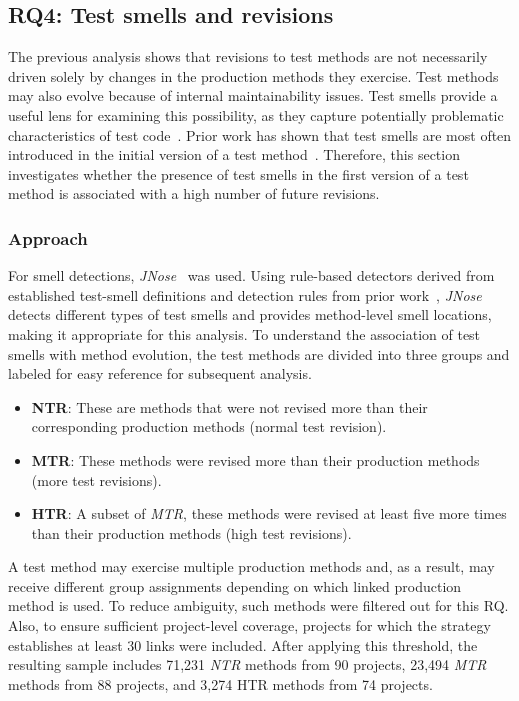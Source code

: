 \subsection{RQ4: Test smells and revisions}
The previous analysis shows that revisions to test methods are not necessarily driven solely by changes in the production methods they exercise. Test methods may also evolve because of internal maintainability issues. Test smells provide a useful lens for examining this possibility, as they capture potentially problematic characteristics of test code~\cite{bavota2015test,Spadini:2018,panichella2022test}. Prior work has shown that test smells are most often introduced in the initial version of a test method~\cite{tufano2016empirical}. Therefore, this section investigates whether the presence of test smells in the first version of a test method is associated with a high number of future revisions.

\subsubsection{Approach}
For smell detections, \emph{JNose}~\cite{virginio2020jnose} was used. Using rule-based detectors derived from established test-smell definitions and detection rules from prior work~\cite{tufano2016empirical,garousi2018smells}, \emph{JNose} detects different types of test smells and provides method-level smell locations, making it appropriate for this analysis. To understand the association of test smells with method evolution, the test methods are divided into three groups and labeled for easy reference for subsequent analysis.
\begin{itemize}
    \item \textbf{NTR}: These are methods that were not revised more than their corresponding production methods (normal test revision).
    \item \textbf{MTR}: These methods were revised more than their production methods (more test revisions).
    \item \textbf{HTR}: A subset of \emph{MTR}, these methods were revised at least five more times than their production methods (high test revisions).
\end{itemize}

A test method may exercise multiple production methods and, as a result, may
receive different group assignments depending on which linked production method
is used. To reduce ambiguity, such methods were filtered out for this RQ. Also, to ensure
sufficient project-level coverage, projects for which the strategy establishes at least 30 links were included. After applying this threshold, the resulting sample includes 71,231 \emph{NTR} methods from 90 projects, 23,494 \emph{MTR} methods from 88 projects, and 3,274 HTR methods from 74 projects.

